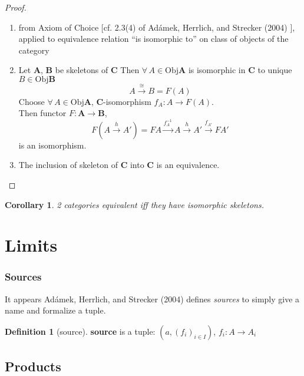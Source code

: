 \documentclass[twoside,landscape,10pt]{amsart}
\theoremstyle{plain}
\newtheorem{corollary}{Corollary}
\theoremstyle{definition}
\newtheorem{definition}{Definition}
\theoremstyle{remark}
\begin{document}
\begin{multicols*}{2}
\begin{proof}
\begin{enumerate}
  \item from Axiom of Choice [cf. 2.3(4) of Ad\'{a}mek, Herrlich, and Strecker (2004) \cite{AHS2004}], applied to equivalence relation ``is isomorphic to'' on class of objects of the category
  \item Let $\mathbf{A}$, $\mathbf{B}$ be skeletons of $\mathbf{C}$
Then $\forall \, A \in \text{Obj}\mathbf{A}$ is isomorphic in $\mathbf{C}$ to unique $B\in \text{Obj}\mathbf{B}$
\[
A \xrightarrow{ \cong} B = F(A)
\]
Choose $\forall \, A \in \text{Obj}\mathbf{A}$, $\mathbf{C}$-isomorphism $f_A: A \to F(A)$.  \\
Then functor $F:\mathbf{A} \to \mathbf{B}$,
\[
F(A\xrightarrow{h} A') = FA \xrightarrow{ f_A^{-1} }A \xrightarrow{h} A' \xrightarrow{f_{A'}} FA'
\]
is an isomorphism.  
  \item The inclusion of skeleton of $\mathbf{C}$ into $\mathbf{C}$ is an equivalence.  
\end{enumerate}
\end{proof}

\begin{corollary}
2 categories equivalent iff they have isomorphic skeletons.  
\end{corollary}

\section{Limits}


\subsubsection{Sources}

It appears Ad\'{a}mek, Herrlich, and Strecker (2004) \cite{AHS2004} defines \emph{sources} to simply give a name and formalize a tuple.  

\begin{definition}[source]
  \textbf{source} is a tuple: $(a, (f_i)_{i\in I})$, $f_i:A\to A_i$
\end{definition}



\subsection{Products}


\end{multicols*}
\end{document}
